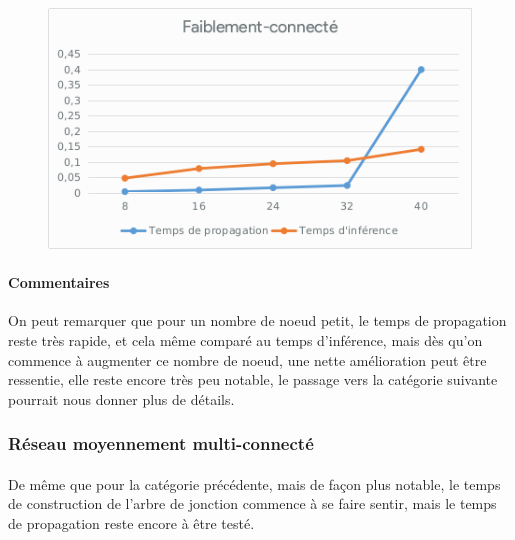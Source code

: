 \documentclass[]{report}
\begin{document}
	\begin{figure}[H]
		\centering
		\includegraphics[width=0.75\linewidth]{sheets/weakly.png}
	\end{figure}

	\paragraph{Commentaires}
	On peut remarquer que pour un nombre de noeud petit, le temps de propagation reste très rapide, et cela même comparé au
	temps d'inférence, mais dès qu'on commence à augmenter ce nombre de noeud, une nette amélioration peut être ressentie, elle
	reste encore très peu notable, le passage vers la catégorie suivante pourrait nous donner plus de détails.


	\subsubsection{Réseau moyennement multi-connecté}
	\paragraph{}
	De même que pour la catégorie précédente, mais de façon plus notable, le temps de construction de l'arbre de jonction commence
	à se faire sentir, mais le temps de propagation reste encore à être testé.

	\begin{table}[H]
	\centering
	\end{table}
\end{document}
